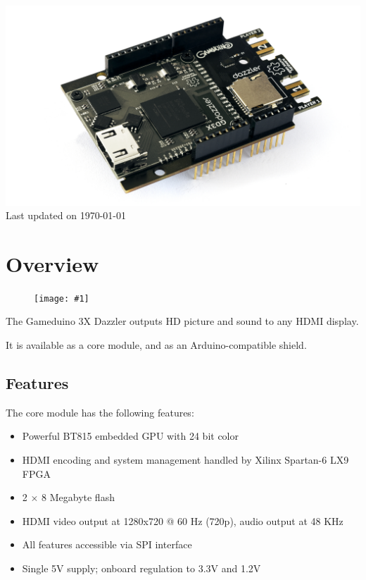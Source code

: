 \documentclass{article}
\newcommand{\device}{Gameduino 3X Dazzler}
\newcommand{\png}[1]{
\begin{figure}[H]
\begin{center}
\texttt{[image: \#1]}
\end{center}
\end{figure}
}
\begin{document}
\newpage
\begin{center}
\includegraphics[width=1.00\textwidth]{img/gameduino-3x-dazzler/gameduino-3x-dazzler-main}
Last updated on \today
\end{center}
\tableofcontents

\newpage

\setlength{\parindent}{0mm}
\setlength{\parskip}{1mm}

\section{Overview}

\png{img/gameduino-3x-dazzler/module}

The \device{} outputs HD picture and sound to any HDMI display.

It is available as a core module, and as an Arduino-compatible shield.

\subsection{Features}

The core module has the following features:

\begin{itemize}
\item Powerful BT815 embedded GPU with 24 bit color
\item HDMI encoding and system management handled by Xilinx Spartan-6 LX9 FPGA
\item 2 $\times$ 8 Megabyte flash
\item HDMI video output at 1280x720 @ 60 Hz (720p), audio output at 48 KHz
\item All features accessible via SPI interface
\item Single 5V supply; onboard regulation to 3.3V and 1.2V
\end{itemize}
\end{document}

